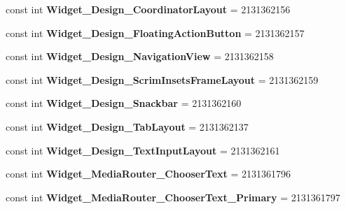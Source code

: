 \begin{DoxyCompactItemize}
const int {\bfseries Widget\+\_\+\+Design\+\_\+\+Coordinator\+Layout} = 2131362156
\item 
\mbox{\label{classXaria_1_1Resource_1_1Style_a033857b2e0229d7e685d7ae807530995}} 
const int {\bfseries Widget\+\_\+\+Design\+\_\+\+Floating\+Action\+Button} = 2131362157
\item 
\mbox{\label{classXaria_1_1Resource_1_1Style_ae5f1b83a5b667253eec6e5bce4b8b928}} 
const int {\bfseries Widget\+\_\+\+Design\+\_\+\+Navigation\+View} = 2131362158
\item 
\mbox{\label{classXaria_1_1Resource_1_1Style_a4f81418fc055cb70daa0059c1fac5875}} 
const int {\bfseries Widget\+\_\+\+Design\+\_\+\+Scrim\+Insets\+Frame\+Layout} = 2131362159
\item 
\mbox{\label{classXaria_1_1Resource_1_1Style_a5ae28d31362d6746e03c5b8c28e6cf08}} 
const int {\bfseries Widget\+\_\+\+Design\+\_\+\+Snackbar} = 2131362160
\item 
\mbox{\label{classXaria_1_1Resource_1_1Style_a5e1fc317bbf17d85d6ee7b1e920b42fa}} 
const int {\bfseries Widget\+\_\+\+Design\+\_\+\+Tab\+Layout} = 2131362137
\item 
\mbox{\label{classXaria_1_1Resource_1_1Style_a6aec67b57b870395a9ac165774823dd3}} 
const int {\bfseries Widget\+\_\+\+Design\+\_\+\+Text\+Input\+Layout} = 2131362161
\item 
\mbox{\label{classXaria_1_1Resource_1_1Style_ae536aa7829bd21fce512913e7a59aceb}} 
const int {\bfseries Widget\+\_\+\+Media\+Router\+\_\+\+Chooser\+Text} = 2131361796
\item 
\mbox{\label{classXaria_1_1Resource_1_1Style_a356acbe5d1ed88c27e20fe13c3566ea4}} 
const int {\bfseries Widget\+\_\+\+Media\+Router\+\_\+\+Chooser\+Text\+\_\+\+Primary} = 2131361797
\item 
\mbox{\label{classXaria_1_1Resource_1_1Style_ac5a51a3d92b058ca7ff4930b89fa5d6d}} 

\end{DoxyCompactItemize}

